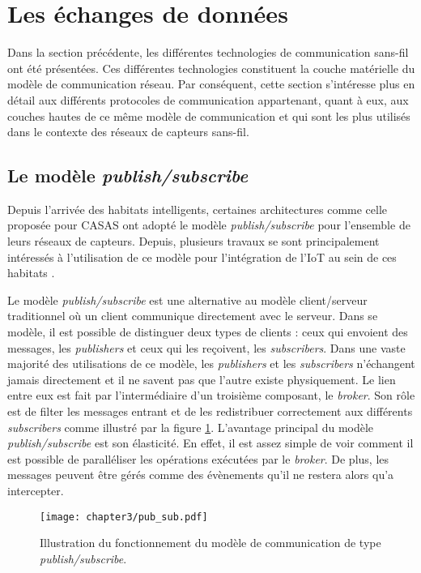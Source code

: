\section{Les échanges de données}

Dans la section précédente, les différentes technologies de communication sans-fil ont été présentées. Ces différentes technologies constituent la couche matérielle du modèle de communication réseau. Par conséquent, cette section s'intéresse plus en détail aux différents protocoles de communication appartenant, quant à eux, aux couches hautes de ce même modèle de communication et qui sont les plus utilisés dans le contexte des réseaux de capteurs sans-fil.

\subsection{Le modèle \textit{publish/subscribe}}

Depuis l'arrivée des habitats intelligents, certaines architectures comme celle proposée pour CASAS \citep{Cook2013} ont adopté le modèle \textit{publish/subscribe} pour l'ensemble de leurs réseaux de capteurs. Depuis, plusieurs travaux se sont principalement intéressés à l'utilisation de ce modèle pour l'intégration de l'\acs{IoT} au sein de ces habitats \citep{Lee2014, Upadhyay2016, VandenBossche2018}.

Le modèle \textit{publish/subscribe} est une alternative au modèle client/serveur traditionnel où un client communique directement avec le serveur. Dans se modèle, il est possible de distinguer deux types de clients : ceux qui envoient des messages, les \textit{publishers} et ceux qui les reçoivent, les \textit{subscribers}. Dans une vaste majorité des utilisations de ce modèle, les \textit{publishers} et les \textit{subscribers} n'échangent jamais directement et il ne savent pas que l'autre existe physiquement. Le lien entre eux est fait par l'intermédiaire d'un troisième composant, le \textit{broker}. Son rôle est de filter les messages entrant et de les redistribuer correctement aux différents \textit{subscribers} comme illustré par la figure \ref{fig:pub_sub}. L'avantage principal du modèle \textit{publish/subscribe} est son élasticité. En effet, il est assez simple de voir comment il est possible de paralléliser les opérations exécutées par le \textit{broker}. De plus, les messages peuvent être gérés comme des évènements qu'il ne restera alors qu'a intercepter.

\begin{figure}[H]
	\centering
	\texttt{[image: chapter3/pub\_sub.pdf]}
        \caption{Illustration du fonctionnement du modèle de communication de type \textit{publish/subscribe}.}
	\label{fig:pub_sub}
\end{figure}

